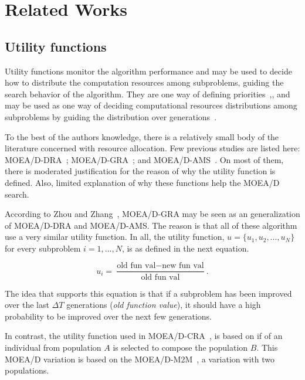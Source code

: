\section{Related Works}

\subsection{Utility functions}


Utility functions monitor the algorithm performance and may be used to decide how to distribute the computation resources among subproblems, guiding the search behavior of the algorithm. They are one way of defining priorities~\cite{chankong1983multiobjective},\cite{hansson2005decision},  and may be used as one way of deciding computational resources distributions among subproblems by guiding the distribution over generations~\cite{cai2015external}. 


To the best of the authors knowledge, there is a relatively small body of the literature concerned with resource allocation. Few previous studies are listed here: MOEA/D-DRA~\cite{zhang2009performance}; MOEA/D-GRA~\cite{zhou2016all}; and MOEA/D-AMS~\cite{chiang2011moea}. On most of them, there is moderated justification for the reason of why the utility function is defined. Also, limited explanation of why these functions help the MOEA/D search.

According to Zhou and Zhang~\cite{zhou2016all}, MOEA/D-GRA may be seen as an generalization of MOEA/D-DRA and MOEA/D-AMS. The reason is that all of these algorithm use a very similar utility function. In all, the utility function, $u = \{u_1, u_2, ..., u_N\}$ for every subproblem $i=1,...,N$, is as defined in the next equation.

\begin{equation}\label{utility}
	u_i = \dfrac{\text{old fun val}-\text{new fun val}}{\text{old fun val}}.
\end{equation}


The idea that supports this equation is that if a subproblem has been improved over the last $\Delta T$ generations (\textit{old function value}), it should have a high probability to be improved over the next few generations. 

In contrast, the utility function used in MOEA/D-CRA~\cite{kang2018collaborative}, is based on if of an individual from population $A$ is selected to compose the population $B$. This MOEA/D variation is based on the MOEA/D-M2M~\cite{liu2014decomposition}, a variation with two populations. 

